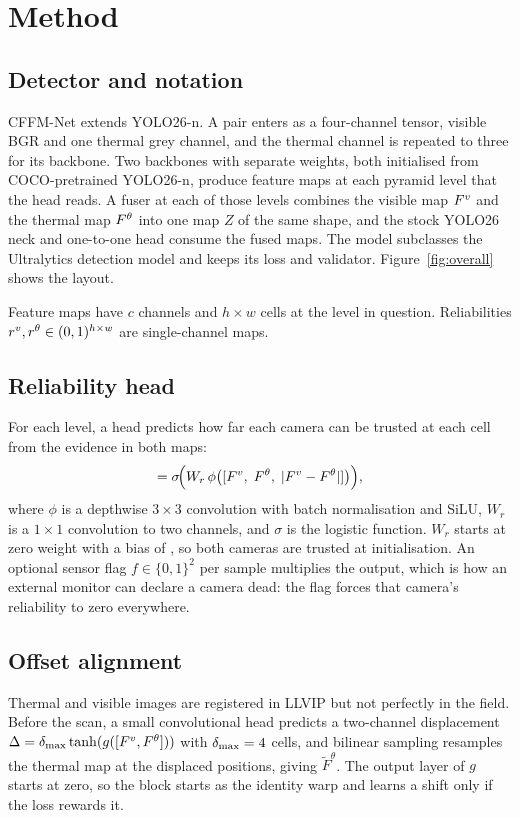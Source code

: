 \section{Method}
\label{sec:method}
\subsection{Detector and notation}
CFFM-Net extends YOLO26-n. A pair enters as a four-channel tensor, visible BGR and one thermal grey channel, and the thermal channel is repeated to three for its backbone. Two backbones with separate weights, both initialised from COCO-pretrained YOLO26-n, produce feature maps at each pyramid level that the head reads. A fuser at each of those levels combines the visible map $F^{v}$ and the thermal map $F^{\theta}$ into one map $Z$ of the same shape, and the stock YOLO26 neck and one-to-one head consume the fused maps. The model subclasses the Ultralytics detection model and keeps its loss and validator. Figure~\ref{fig:overall} shows the layout.

Feature maps have $c$ channels and $h\times w$ cells at the level in question. Reliabilities $r^{v},r^{\theta}\in(0,1)^{h\times w}$ are single-channel maps.

\subsection{Reliability head}
For each level, a head predicts how far each camera can be trusted at each cell from the evidence in both maps:
\begin{equation}
[\rv,\rt]=\sigma\!\Big(W_r\,\phi\big([\Fv,\;\Ft,\;|\Fv-\Ft|]\big)\Big),
\end{equation}
where $\phi$ is a depthwise $3{\times}3$ convolution with batch normalisation and SiLU, $W_r$ is a $1{\times}1$ convolution to two channels, and $\sigma$ is the logistic function. $W_r$ starts at zero weight with a bias of \cfgInitBias{}, so both cameras are trusted at initialisation. An optional sensor flag $f\in\{0,1\}^2$ per sample multiplies the output, which is how an external monitor can declare a camera dead: the flag forces that camera's reliability to zero everywhere.

\subsection{Offset alignment}
Thermal and visible images are registered in LLVIP but not perfectly in the field. Before the scan, a small convolutional head predicts a two-channel displacement $\Delta=\delta_{\max}\tanh(g([F^{v},F^{\theta}]))$ with $\delta_{\max}=4{}$ cells, and bilinear sampling resamples the thermal map at the displaced positions, giving $\tilde F^{\theta}$. The output layer of $g$ starts at zero, so the block starts as the identity warp and learns a shift only if the loss rewards it.


